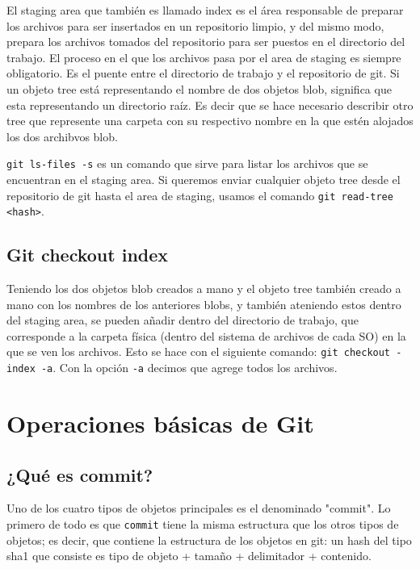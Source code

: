 El staging area que también es llamado index es el área responsable de preparar los archivos para ser insertados en un repositorio limpio, y del mismo modo, prepara los archivos tomados del repositorio para ser puestos en el directorio del trabajo. El proceso en el que los archivos pasa por el area de staging es siempre obligatorio. Es el puente entre el directorio de trabajo y el repositorio de git. Si un objeto tree está representando el nombre de dos objetos blob, significa que esta representando un directorio raíz. Es decir que se hace necesario describir otro tree que represente una carpeta con su respectivo nombre en la que estén alojados los dos archibvos blob.

\texttt{git ls-files -s} es un comando que sirve para listar los archivos que se encuentran en el staging area. Si queremos enviar cualquier objeto tree desde el repositorio de git hasta el area de staging, usamos el comando \texttt{git read-tree <hash>}.

\subsection{Git checkout index}

Teniendo los dos objetos blob creados a mano y el objeto tree también creado a mano con los nombres de los anteriores blobs, y también ateniendo estos dentro del staging area, se pueden añadir dentro del directorio de trabajo, que corresponde a la carpeta física (dentro del sistema de archivos de cada SO) en la que se ven los archivos. Esto se hace con el siguiente comando: \texttt{git checkout -index -a}. Con la opción \texttt{-a} decimos que agrege todos los archivos.

\section{Operaciones básicas de Git}

\subsection{¿Qué es commit?}

Uno de los cuatro tipos de objetos principales es el denominado "commit". Lo primero de todo es que \texttt{commit} tiene la misma estructura que los otros tipos de objetos; es decir, que contiene la estructura de los objetos en git: un hash del tipo sha1 que consiste es tipo de objeto + tamaño + delimitador + contenido. \\

